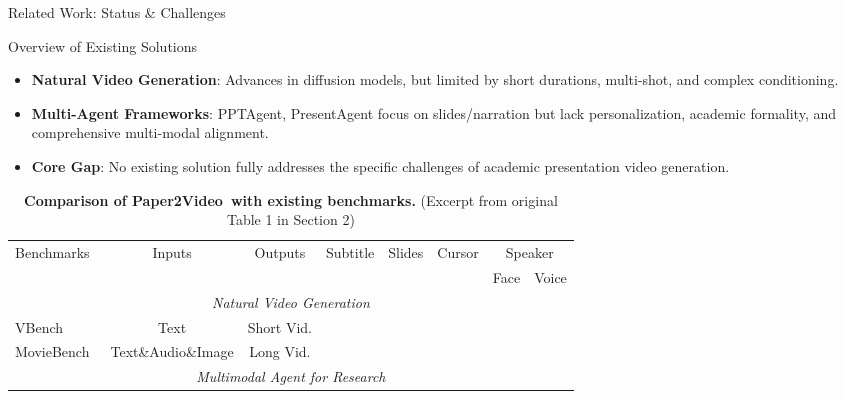 \documentclass{beamer}
\newcommand{\cmark}{\ding{51}}%
\newcommand{\xmark}{\ding{55}}%
\newcommand{\alertterm}[1]{\alert{\textbf{#1}}}
\newcommand{\bench}{Paper2Video}
\begin{document}
\begin{frame}{Related Work: Status \& Challenges} %
  \begin{block}{\small Overview of Existing Solutions}
    \small
    \begin{itemize}
      \item \alertterm{Natural Video Generation}: Advances in diffusion models, but limited by short durations, multi-shot, and complex conditioning.
      \item \alertterm{Multi-Agent Frameworks}: PPTAgent, PresentAgent focus on slides/narration but lack personalization, academic formality, and comprehensive multi-modal alignment.
      \item \alertterm{Core Gap}: No existing solution fully addresses the specific challenges of academic presentation video generation.
    \end{itemize}
  \end{block}
  \begin{table}[ht]
    \centering
    \tiny %
    \caption{\textbf{Comparison of \bench~with existing benchmarks.} (Excerpt from original Table 1 in Section 2)}
    \label{tab:related_work_comparison}
    \setlength{\tabcolsep}{2pt} %
    \begin{tabular}{@{}lccccccc@{}}
      \toprule
      \multirow{2}{*}{Benchmarks} &
      \multirow{2}{*}{Inputs} &
      \multirow{2}{*}{Outputs} &
      \multirow{2}{*}{Subtitle} &
      \multirow{2}{*}{Slides} &
      \multirow{2}{*}{Cursor} &
      \multicolumn{2}{c}{Speaker} \\
      \cmidrule(lr){7-8}
       & & & & & & Face & Voice \\
      \midrule
      \multicolumn{8}{c}{{\textcolor[RGB]{105, 105, 105}{\textit{Natural Video Generation}}}}  \\
      VBench~\cite{vbench} & Text & Short Vid. & \xmark & \xmark & \xmark & \xmark & \xmark \\
      MovieBench~\cite{wu2025moviebench} & Text\&Audio\&Image & Long Vid. & \textcolor{citecolor}{\cmark} & \xmark & \xmark & \textcolor{citecolor}{\cmark} & \textcolor{citecolor}{\cmark} \\
      \midrule
      \multicolumn{8}{c}{{\textcolor[RGB]{105, 105, 105}{\textit{Multimodal Agent for Research}}}}  \\

\end{tabular}
\end{table}
\end{frame}
\end{document}
